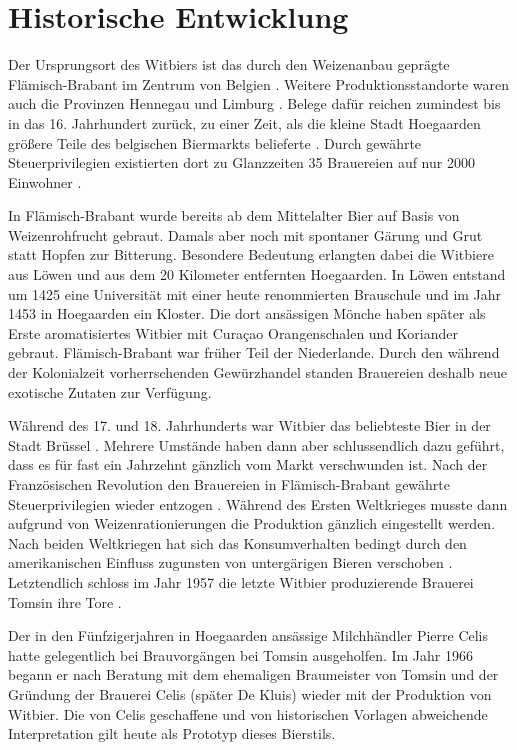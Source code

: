\documentclass[a4paper,parskip=half]{scrartcl}
\begin{document}
\section*{Historische Entwicklung}

Der Ursprungsort des Witbiers ist das durch den Weizenanbau geprägte
Flämisch-Brabant im Zentrum von Belgien \parencite[44]{Roncoroni2018}.
Weitere Produktionsstandorte waren auch die Provinzen Hennegau und
Limburg \parencite[118]{Strottner1999}.
Belege dafür reichen zumindest bis in das 16. Jahrhundert
zurück, zu einer Zeit, als die kleine Stadt Hoegaarden größere
Teile des belgischen Biermarkts belieferte \parencite[46]{Mulder2020}. 
Durch gewährte Steuerprivilegien existierten dort zu Glanzzeiten 35
Brauereien auf nur 2000 Einwohner \parencite[27]{Sparrow2002}.

In Flämisch-Brabant wurde bereits ab dem Mittelalter Bier auf
Basis von Weizenrohfrucht gebraut. Damals aber noch mit
spontaner Gärung und Grut statt Hopfen zur Bitterung.
Besondere Bedeutung erlangten dabei die Witbiere aus Löwen
und aus dem 20 Kilometer entfernten Hoegaarden. In Löwen
entstand um 1425 eine Universität mit einer heute renommierten Brauschule
und im Jahr 1453 in Hoegaarden ein Kloster. Die dort ansässigen
Mönche haben später als Erste aromatisiertes Witbier mit
Curaçao Orangenschalen und Koriander gebraut. Flämisch-Brabant war
früher Teil der Niederlande. Durch den während der
Kolonialzeit vorherrschenden Gewürzhandel standen
Brauereien deshalb neue exotische Zutaten zur Verfügung.
\parencite[1,4]{Strottner1999}

Während des 17. und 18. Jahrhunderts war Witbier das beliebteste Bier
in der Stadt Brüssel \parencite{Zainasheff2007}.
Mehrere Umstände haben dann aber schlussendlich dazu geführt, dass
es für fast ein Jahrzehnt gänzlich vom Markt verschwunden ist.
Nach der Französischen Revolution den Brauereien in
Flämisch-Brabant gewährte Steuerprivilegien wieder entzogen
\parencite[44]{Roncoroni2018}. Während des Ersten Weltkrieges
musste dann aufgrund von Weizenrationierungen die Produktion gänzlich
eingestellt werden. Nach beiden Weltkriegen hat sich
das Konsumverhalten bedingt durch den amerikanischen
Einfluss zugunsten von untergärigen Bieren verschoben \parencite[4]{Strottner1999}.
Letztendlich schloss im Jahr 1957 die letzte
Witbier produzierende Brauerei Tomsin ihre Tore \parencite[44]{Roncoroni2018}.

Der in den Fünfzigerjahren in Hoegaarden ansässige Milchhändler Pierre
Celis hatte gelegentlich bei Brauvorgängen bei Tomsin ausgeholfen. Im
Jahr 1966 begann er nach Beratung mit dem ehemaligen
Braumeister von Tomsin und der Gründung der Brauerei Celis
(später De Kluis) wieder mit der Produktion von Witbier. Die von
Celis geschaffene und von historischen Vorlagen abweichende Interpretation
gilt heute als Prototyp dieses Bierstils.
\parencite[37,49]{Hieronymus2010} 
\end{document}
